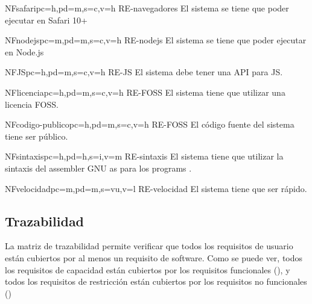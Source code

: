 \begin{softwareReq}{NF}{safari}{pc=h,pd=m,s=c,v=h}
    {RE-navegadores}
    El sistema se tiene que poder ejecutar en Safari 10+
\end{softwareReq}

\begin{softwareReq}{NF}{nodejs}{pc=m,pd=m,s=c,v=h}
    {RE-nodejs}
    El sistema se tiene que poder ejecutar en Node.js
\end{softwareReq}

\begin{softwareReq}{NF}{JS}{pc=h,pd=m,s=c,v=h}
    {RE-JS}
    El sistema debe tener una \gls{API} para \gls{JS}.
\end{softwareReq}

\begin{softwareReq}{NF}{licencia}{pc=h,pd=m,s=c,v=h}
    {RE-FOSS}
    El sistema tiene que utilizar una licencia \gls{FOSS}.
\end{softwareReq}

\begin{softwareReq}{NF}{codigo-publico}{pc=h,pd=m,s=c,v=h}
    {RE-FOSS}
    El código fuente del sistema tiene ser público.
\end{softwareReq}

\begin{softwareReq}{NF}{sintaxis}{pc=h,pd=h,s=i,v=m}
    {RE-sintaxis}
    El sistema tiene que utilizar la sintaxis del \gls{assembler} GNU as para
    los \glspl{program} .
\end{softwareReq}

\begin{softwareReq}{NF}{velocidad}{pc=m,pd=m,s=vu,v=l}
    {RE-velocidad}
    El sistema tiene que ser rápido. %
\end{softwareReq}

\FloatBarrier


\subsection{Trazabilidad}\label{subsec:trazability}

La matriz de trazabilidad permite verificar que todos los requisitos de usuario
están cubiertos por al menos un requisito de software. Como se puede ver, todos
los requisitos de capacidad están cubiertos por los requisitos funcionales
(), y todos los requisitos de restricción están
cubiertos por los requisitos no funcionales ()

